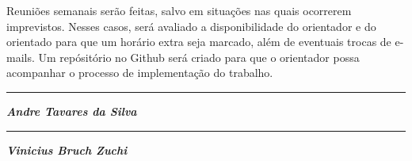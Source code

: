 \documentclass[11pt]{article}
\begin{document}
Reuniões semanais serão feitas, salvo em situações nas quais ocorrerem imprevistos.
Nesses casos, será avaliado a disponibilidade do orientador e do orientado para que um
horário extra seja marcado, além de eventuais trocas de e-mails. Um repósitório no Github
será criado para que o orientador possa acompanhar o processo de implementação do trabalho.




\vskip 2.5cm

\begin{minipage} {0.49\linewidth}
  \centering
  \rule{7.2cm}{0.1mm}

  \textbf{\textit{Andre Tavares da Silva}}
\end{minipage}
\begin{minipage} {0.49\linewidth}
  \centering
  \rule{7.2cm}{0.1mm}

  \textbf{\textit{Vinicius Bruch Zuchi}}
\end{minipage}
\end{document}
